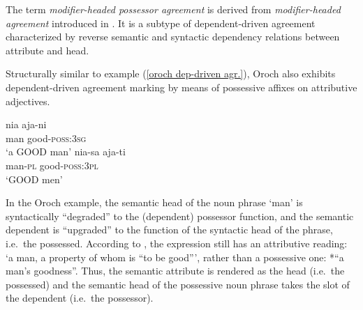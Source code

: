 The term \emph{modifier-headed possessor agreement} is derived from \emph{modifier-headed agreement} introduced in \citet{AUTOTYP-NP}. It is a subtype of dependent-driven agreement characterized by reverse semantic and syntactic dependency relations between attribute and head. 

Structurally similar to example (\ref{oroch dep-driven agr.}), Oroch also exhibits dependent-driven agreement marking by means of possessive affixes on attributive adjectives.

\begin{exe}
\ex
{} \label{oroch mod-headed agr}
\begin{xlist}
\ex
\gll 	nia	aja-ni\\
	man	good-\textsc{poss:3sg}\\
\glt	‘a GOOD man’
\ex 
\gll nia-sa aja-ti\\	
	man-\textsc{pl} good-\textsc{poss:3pl}\\
\glt	‘GOOD men’
\end{xlist}
\end{exe}
In the Oroch example, the semantic head of the noun phrase ‘man’ is syntactically “degraded” to the (dependent) possessor function, and the semantic dependent is “upgraded” to the function of the syntactic head of the phrase, i.e.~the possessed. According to \citet[3]{malchukov2000}, the expression still has an attributive reading: ‘a man, a property of whom is “to be good”’, rather than a possessive one: *“a man's goodness”. Thus, the semantic attribute is rendered as the head (i.e.~the possessed) and the semantic head of the possessive noun phrase takes the slot of the dependent (i.e.~the possessor).

